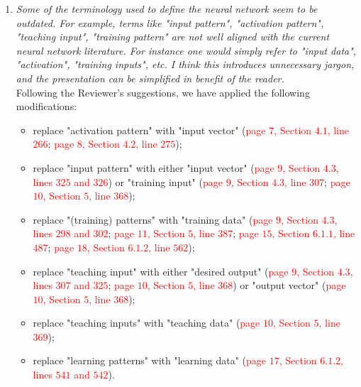 \documentclass[longtitle]{elsarticle}
\theoremstyle{theorem}
\theoremstyle{definition}
\theoremstyle{remark}
\theoremstyle{proposition}
\numberwithin{figure}{section}
\begin{document}
\begin{enumerate}
			\item \emph{Some of the terminology used to define the neural network seem to be outdated. For example, terms like "input pattern", "activation pattern", "teaching input", "training pattern" are not well aligned with the current neural network literature. For instance one would simply refer to "input data", "activation", "training inputs", etc. I think this introduces unnecessary jargon, and the presentation can be simplified in benefit of the reader.} \\[0.3cm]
			Following the Reviewer's suggestions, we have applied the following modifications:
			\begin{itemize}
				\item replace "activation pattern" with "input vector" (\textcolor{red}{page $7$, Section $4.1$, line $266$}; \textcolor{red}{page $8$, Section $4.2$, line $275$});
				\item replace "input pattern" with either "input vector" (\textcolor{red}{page $9$, Section $4.3$, lines $325$ and $326$}) or "training input" (\textcolor{red}{page $9$, Section $4.3$, line $307$}; \textcolor{red}{page $10$, Section $5$, line $368$});
				\item replace "(training) patterns" with "training data" (\textcolor{red}{page $9$, Section $4.3$, lines $298$ and $302$}; \textcolor{red}{page $11$, Section $5$, line $387$}; \textcolor{red}{page $15$, Section $6.1.1$, line $487$}; \textcolor{red}{page $18$, Section $6.1.2$, line $562$});
				\item replace "teaching input" with either "desired output" (\textcolor{red}{page $9$, Section $4.3$, lines $307$ and $325$}; \textcolor{red}{page $10$, Section $5$, line $368$}) or "output vector" (\textcolor{red}{page $10$, Section $5$, line $368$});
				\item replace "teaching inputs" with "teaching data" (\textcolor{red}{page $10$, Section $5$, line $369$});
				\item replace "learning patterns" with "learning data" (\textcolor{red}{page $17$, Section $6.1.2$, lines $541$ and $542$}).
			\end{itemize}
			

\end{enumerate}
\end{document}
